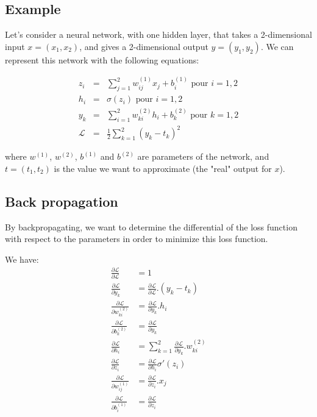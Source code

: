 \documentclass[10pt,a4paper]{article}
\theoremstyle{definition}
\theoremstyle{definition}
\begin{document}
\subsection{Example} \label{2.1}

Let's consider a neural network, with one hidden layer, that takes a 2-dimensional input $x = (x_1, x_2)$, and gives a 2-dimensional output $y = (y_1,y_2)$. We can represent this network with the following equations:

   \begin{eqnarray}
   \nonumber
   z_i & = & \sum_{j=1}^2 w_{ij}^{(1)}x_j + b_i^{(1)} \text{ pour } i = 1,2 \\ 
   \nonumber
   h_i & = & \sigma (z_i) \text{ pour } i=1,2 \\
   \nonumber
   y_k & = & \sum_{i=1}^2 w_{ki}^{(2)}h_i + b_k^{(2)} \text{ pour } k = 1,2 \\
   \nonumber
   \mathcal{L} & = & \frac{1}{2} \sum_{k = 1}^2 (y_k - t_k)^2
   \end{eqnarray}
   
where $w^{(1)}$, $w^{(2)}$, $b^{(1)}$ and $b^{(2)}$ are parameters of the network, and $t = (t_1, t_2)$ is the value we want to approximate (the "real" output for $x$). 

\subsection{Back propagation}

By backpropagating, we want to determine the differential of the loss function with respect to the parameters in order to minimize this loss function.

We have:
\begin{align*}
\frac{\partial \mathcal{L}}{\partial \mathcal{L}} &= 1 \\
\frac{\partial \mathcal{L}}{\partial y_k} &= \frac{\partial \mathcal{L}}{\partial \mathcal{L}} . (y_k - t_k) \\
\frac{\partial \mathcal{L}}{\partial w_{ki}^{(2)}} &= \frac{\partial \mathcal{L}}{\partial y_k} . h_i \\
\frac{\partial \mathcal{L}}{\partial b_k^{(2)}} &= \frac{\partial \mathcal{L}}{\partial y_k} \\
\frac{\partial \mathcal{L}}{\partial h_i} &= \sum_{k = 1}^2 \frac{\partial \mathcal{L}}{\partial y_k} . w_{ki}^{(2)} \\
\frac{\partial \mathcal{L}}{\partial z_i} &= \frac{\partial \mathcal{L}}{\partial h_i} \sigma '(z_i) \\
\frac{\partial \mathcal{L}}{\partial w_{ij}^{(1)}} &= \frac{\partial \mathcal{L}}{\partial z_i} . x_j \\
\frac{\partial \mathcal{L}}{\partial b_i^{(1)}} &= \frac{\partial \mathcal{L}}{\partial z_i} \\
\end{align*}
\end{document}
